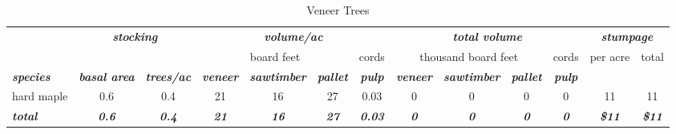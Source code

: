 \documentclass[landscape]{article}
\begin{document}
\begin{table}[H]

\caption{\label{tab:unnamed-chunk-53}Veneer Trees}
\fontsize{10}{12}\selectfont
\begin{tabular}[t]{lcccccccccccc}
\toprule
\multicolumn{1}{c}{\em{\textbf{ }}} & \multicolumn{2}{c}{\em{\textbf{stocking}}} & \multicolumn{4}{c}{\em{\textbf{volume/ac }}} & \multicolumn{4}{c}{\em{\textbf{total volume}}} & \multicolumn{2}{c}{\em{\textbf{stumpage}}} \\
\cmidrule(l{3pt}r{3pt}){2-3} \cmidrule(l{3pt}r{3pt}){4-7} \cmidrule(l{3pt}r{3pt}){8-11} \cmidrule(l{3pt}r{3pt}){12-13}
\multicolumn{3}{c}{ } & \multicolumn{3}{c}{board feet} & \multicolumn{1}{c}{cords} & \multicolumn{3}{c}{thousand board feet} & \multicolumn{1}{c}{cords} & \multicolumn{1}{c}{per acre} & \multicolumn{1}{c}{total} \\
\cmidrule(l{3pt}r{3pt}){4-6} \cmidrule(l{3pt}r{3pt}){7-7} \cmidrule(l{3pt}r{3pt}){8-10} \cmidrule(l{3pt}r{3pt}){11-11} \cmidrule(l{3pt}r{3pt}){12-12} \cmidrule(l{3pt}r{3pt}){13-13}
\rowcolor[HTML]{DCDCDC}  \em{\textbf{species}} & \em{\textbf{basal area}} & \em{\textbf{trees/ac}} & \em{\textbf{veneer}} & \em{\textbf{sawtimber}} & \em{\textbf{pallet}} & \em{\textbf{pulp}} & \em{\textbf{veneer}} & \em{\textbf{sawtimber}} & \em{\textbf{pallet}} & \em{\textbf{pulp}} & \em{\textbf{ }} & \em{\textbf{ }}\\
\midrule
\rowcolor{gray!6}  hard maple & 0.6 & 0.4 & 21 & 16 & 27 & 0.03 & 0 & 0 & 0 & 0 & 11 & 11\\
 
\rowcolor[HTML]{DCDCDC}  \em{\textbf{total}} & \em{\textbf{0.6}} & \em{\textbf{0.4}} & \em{\textbf{21}} & \em{\textbf{16}} & \em{\textbf{27}} & \em{\textbf{0.03}} & \em{\textbf{0}} & \em{\textbf{0}} & \em{\textbf{0}} & \em{\textbf{0}} & \em{\textbf{\$11}} & \em{\textbf{\$11}}\\
\bottomrule
\end{tabular}
\end{table}
\end{document}
